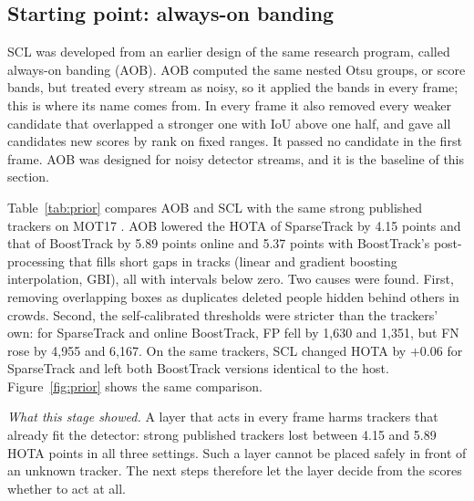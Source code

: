 \documentclass[pdflatex,sn-mathphys-num,iicol]{sn-jnl}
\newcommand{\scl}{SCL}
\newcommand{\aob}{AOB}
\begin{document}
\subsection{Starting point: always-on banding}\label{sec:prior}
\scl{} was developed from an earlier design of the same research program,
called always-on banding (\aob{}). \aob{} computed the same nested Otsu
groups, or score bands, but treated every stream as noisy, so it applied the
bands in every frame; this is where its name comes from. In every frame it
also removed every weaker candidate that overlapped a stronger one with
IoU above one half, and gave all candidates new scores by rank on fixed
ranges. It passed no candidate in the first frame. \aob{} was designed for
noisy detector streams, and it is the baseline of this section.

Table~\ref{tab:prior} compares \aob{} and \scl{} with the same strong
published trackers on MOT17 \cite{milan2016mot16}. \aob{} lowered the HOTA of
SparseTrack by 4.15 points and that of BoostTrack by 5.89 points online and
5.37 points with BoostTrack's post-processing that fills short gaps in
tracks (linear and gradient boosting interpolation, GBI), all with
intervals below zero. Two causes
were found. First, removing overlapping boxes as duplicates deleted people
hidden behind others in crowds. Second, the self-calibrated thresholds were
stricter than the trackers' own: for SparseTrack and online BoostTrack, FP
fell by 1,630 and 1,351, but FN rose by 4,955 and 6,167. On the same trackers, \scl{} changed HOTA by $+0.06$ for SparseTrack
and left both BoostTrack versions identical to the host.
Figure~\ref{fig:prior} shows the same comparison.

\emph{What this stage showed.} A layer that acts in every frame harms
trackers that already fit the detector: strong published trackers lost
between 4.15 and 5.89 HOTA points in all three settings. Such a layer cannot
be placed safely in front of an unknown tracker. The next steps therefore let
the layer decide from the scores whether to act at all.
\end{document}
